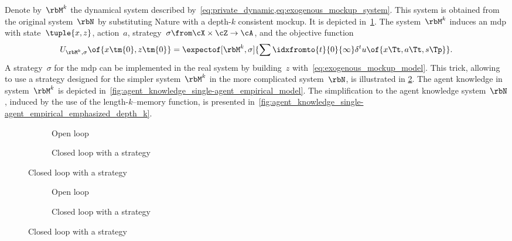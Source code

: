 Denote by~\(\rbM\K\) the dynamical system described by~\cref{eq:private_dynamic,eq:exogenous_mockup_system}.
This system is obtained from the original system~\(\rbN\) by substituting Nature with a depth-\(k\) consistent mockup.
It is depicted in~\cref{fig:block_diagram_single-agent_model}.
The system~\(\rbM\K\) induces an \ac{mdp} with state~\(\tuple{x, z}\), action~\(a\), strategy~\(\sigma \from \cX \times \cZ \to \cA\), and the objective function
\[
U\params{\rbM\K, \sigma}\of{x\tm{0}, z\tm{0}} = \expectof[\rbM\K, \sigma]{\sum\idxfromto{t}{0}{\infty} \delta^t u \of{x\Tt, a\Tt, s\Tp}}.
\]
A strategy~\(\sigma\) for the \ac{mdp} can be implemented in the real system by building~\(z\) with~\cref{eq:exogenous_mockup_model}.
This trick, allowing to use a strategy designed for the simpler system~\(\rbM\K\) in the more complicated system~\(\rbN\), is illustrated in \cref{fig:block_diagram_single-agent_problem_with_mockup}.
The agent knowledge in system~\(\rbM\K\) is depicted in~\cref{fig:agent_knowledge_single-agent_empirical_model}.
The simplification to the agent knowledge system~\(\rbN\), induced by the use of the length-\(k\)--memory function, is presented in~\cref{fig:agent_knowledge_single-agent_empirical_emphasized_depth_k}.

\begin{figure}[htp]
\begin{subfigure}{0.5\textwidth}
\centering
{}
\caption{Open loop}
\end{subfigure}%
\begin{subfigure}{0.5\textwidth}
\centering
{}
\caption{Closed loop with a strategy}
\end{subfigure}
\label{fig:block_diagram_single-agent_model}
\end{figure}

\begin{figure}[htp]
\begin{subfigure}{0.5\textwidth}
\centering
{}
\caption{Open loop}
\end{subfigure}%
\begin{subfigure}{0.5\textwidth}
\centering
{}
\caption{Closed loop with a strategy}
\end{subfigure}
\label{fig:block_diagram_single-agent_problem_with_mockup}
\end{figure}

